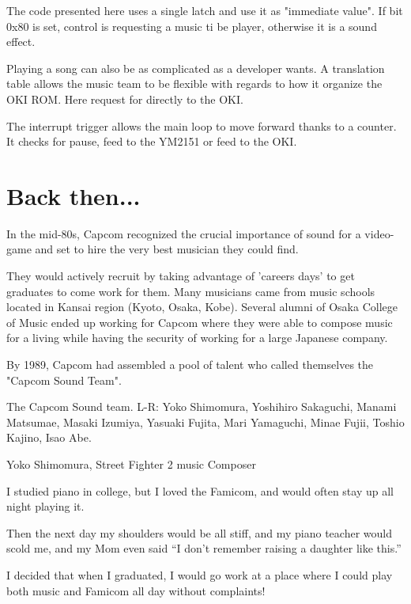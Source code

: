 The code presented here uses a single latch and use it as "immediate value". If bit 0x80 is set, control is requesting a music ti be player, otherwise it is a sound effect. 

Playing a song can also be as complicated as a developer wants. A translation table allows the music team to be flexible with regards to how it organize the OKI ROM. Here request for directly to the OKI.

The interrupt trigger allows the main loop to move forward thanks to a counter. It checks for pause, feed to the YM2151 or feed to the OKI.








\section{Back then...}
In the mid-80s, Capcom recognized the crucial importance of sound for a video-game and set to hire the very best musician they could find.

They would actively recruit by taking advantage of 'careers days' to get graduates to come work for them. Many musicians came from music schools located in Kansai region (Kyoto, Osaka, Kobe). Several alumni of Osaka College of Music ended up working for Capcom where they were able to compose music for a living while having the security of working for a large Japanese company. 

By 1989, Capcom had assembled a pool of talent who called themselves the "Capcom Sound Team".


The Capcom Sound team. L-R: Yoko Shimomura, Yoshihiro Sakaguchi, Manami Matsumae, Masaki Izumiya, Yasuaki Fujita, Mari Yamaguchi, Minae Fujii, Toshio Kajino, Isao Abe.




\begin{q}{Yoko Shimomura, Street Fighter 2 music Composer\cite{beep199010}}

I studied piano in college, but I loved the Famicom, and would often stay up all night playing it. 

Then the next day my shoulders would be all stiff, and my piano teacher would scold me, and my Mom even said “I don’t remember raising a daughter like this.”

I decided that when I graduated, I would go work at a place where I could play both music and Famicom all day without complaints!
\end{q}


